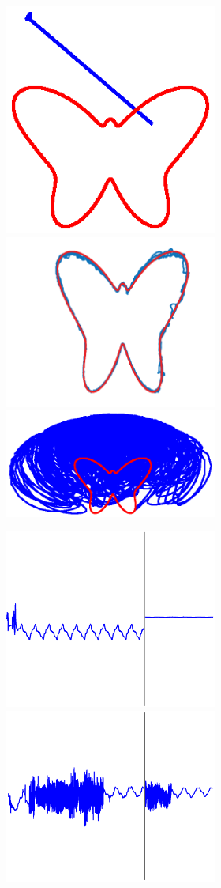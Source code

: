 \begin{figure}
    \begin{subfigure}{\textwidth}
        \centering
        
        \textbf{}\begin{subfigure}{\textwidth}
        \centering
        
        \hspace{0em}
        \includegraphics[trim=4cm 4.25cm 4cm 3.5cm, clip=true, height=.2\linewidth]{Figures/Fig_T4/MATLAB/ST_T3_Trajectory.eps}
        \hspace{2em}
        \includegraphics[trim=0cm 0cm 1cm 0cm, clip=true, height=.15\linewidth]{Figures/Fig_T4/Orig/ST_T3_Trajectory.png}
        \hspace{-.25em}
        \includegraphics[trim=4cm 4.75cm 4cm 3.5cm, clip=true,  height=.2\linewidth]{Figures/Fig_T4/Python/ST_T3_Trajectory.eps}
        \hspace{-3em}
        
        \end{subfigure}
        
        
        \textbf{}\begin{subfigure}{\textwidth}
        \centering
        
        \includegraphics[height=0.1\linewidth,width=.45\linewidth]{Figures/Fig_T4/MATLAB/ST_T3_Theta0.eps}
        \includegraphics[trim=2cm 1cm 2cm 1cm, clip=true, height=0.1\linewidth,width=.45\linewidth]{Figures/Fig_T4/Python/ST_T3_Theta0.eps}
        

\end{subfigure}
\end{subfigure}
\end{figure}
